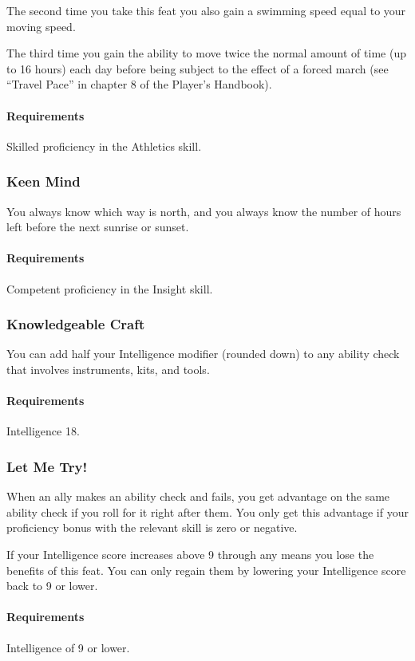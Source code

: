     The second time you take this feat you also gain a swimming speed equal to your moving speed.

    The third time you gain the ability to move twice the normal amount of time (up to 16 hours) each day before being subject to the effect of a forced march (see ``Travel Pace'' in chapter 8 of the Player's Handbook).
    \paragraph{Requirements} Skilled proficiency in the Athletics skill.
\subsubsection{Keen Mind} \label{feat::keenmind}
    You always know which way is north, and you always know the number of hours left before the next sunrise or sunset.
    \paragraph{Requirements} Competent proficiency in the Insight skill.
\subsubsection{Knowledgeable Craft} \label{feat::knowledgeablecraft}
    You can add half your Intelligence modifier (rounded down) to any ability check that involves instruments, kits, and tools.
    \paragraph{Requirements} Intelligence 18.
\subsubsection{Let Me Try!} \label{feat::letmetry}
    When an ally makes an ability check and fails, you get advantage on the same ability check if you roll for it right after them.
    You only get this advantage if your proficiency bonus with the relevant skill is zero or negative.

    If your Intelligence score increases above 9 through any means you lose the benefits of this feat.
    You can only regain them by lowering your Intelligence score back to 9 or lower.
    \paragraph{Requirements} Intelligence of 9 or lower.
